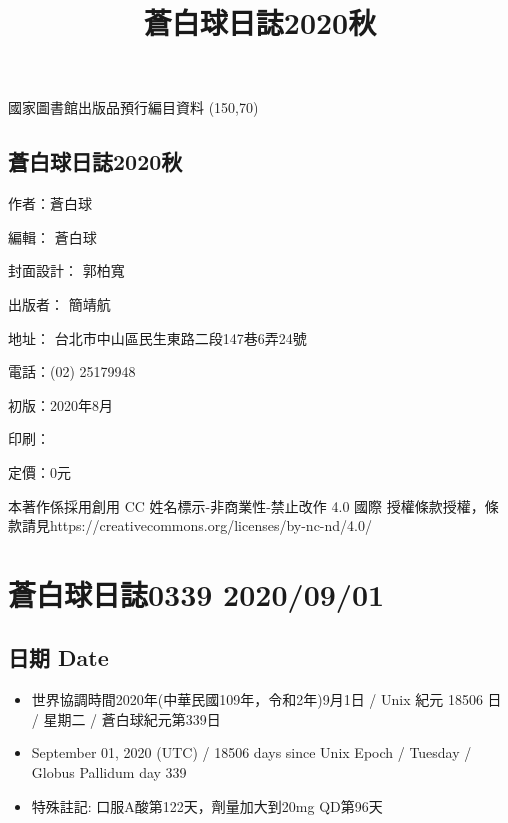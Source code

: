 \documentclass[a5paper, 11pt
]{book}
\title{蒼白球日誌2020秋}
\date{}
\providecommand{\tightlist}{%
  \setlength{\itemsep}{0pt}\setlength{\parskip}{0pt}}
\begin{document}
\clearpage\maketitle
\thispagestyle{empty}
\subsection{}
\begin{flushleft}
國家圖書館出版品預行編目資料 \linebreak
\framebox(150,70){}
\end{flushleft}
\subsection{蒼白球日誌2020秋}
\begin{flushleft}
作者：蒼白球

編輯： 蒼白球

封面設計： 郭柏寬

出版者： 簡靖航

地址： 台北市中山區民生東路二段147巷6弄24號

電話：(02) 25179948

初版：2020年8月

印刷：

定價：0元

本著作係採用創用 CC 姓名標示-非商業性-禁止改作 4.0 國際 授權條款授權，條款請見\linebreak https://creativecommons.org/licenses/by-nc-nd/4.0/
\end{flushleft}
\clearpage
\tableofcontents


\hypertarget{ux84bcux767dux7403ux65e5ux8a8c0339-20200901}{%
\section{蒼白球日誌0339
2020/09/01}\label{ux84bcux767dux7403ux65e5ux8a8c0339-20200901}}

\hypertarget{ux65e5ux671f-date}{%
\subsection{日期 Date}\label{ux65e5ux671f-date}}

\begin{itemize}
\tightlist
\item
  世界協調時間2020年(中華民國109年，令和2年)9月1日 / Unix 紀元 18506 日
  / 星期二 / 蒼白球紀元第339日
\item
  September 01, 2020 (UTC) / 18506 days since Unix Epoch / Tuesday /
  Globus Pallidum day 339
\item
  特殊註記: 口服A酸第122天，劑量加大到20mg QD第96天
\end{itemize}
\end{document}
